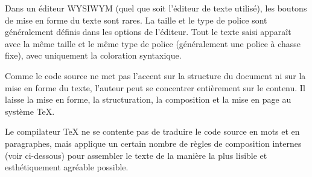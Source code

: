 \documentclass[11pt,a4paper,ngerman,french,DIV=8]{scrartcl}
\begin{document}
Dans un éditeur WYSIWYM (quel que soit l'éditeur de texte utilisé), les boutons de mise en forme du texte sont rares. La taille et le type de police sont généralement définis dans les options de l'éditeur. Tout le texte saisi apparaît avec la même taille et le même type de police (généralement une police à chasse fixe), avec uniquement la coloration syntaxique\footnotemark{}.


Comme le code source ne met pas l'accent sur la structure du document ni sur la mise en forme du texte, l'auteur peut se concentrer entièrement sur le contenu. Il laisse la mise en forme, la structuration, la composition et la mise en page au système \TeX{}.

Le compilateur \TeX{} ne se contente pas de traduire le code source en mots et en paragraphes, mais applique un certain nombre de règles de composition internes (voir ci-dessous) pour assembler le texte de la manière la plus lisible et esthétiquement agréable possible.
\end{document}

